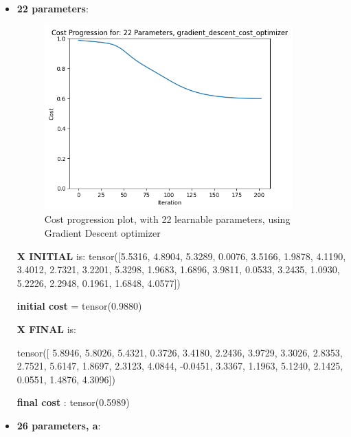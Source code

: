 \documentclass[inscr,ack,preface]{diphdthesis}
\begin{document}
\begin{itemize}
    \item \textbf{22 parameters}:

\begin{figure}[ht]
\begin{center}
    \includegraphics[width=0.9\textwidth]{22.png}
    \caption{Cost progression plot, with 22 learnable parameters, using Gradient Descent optimizer} 
    \label{fig:enter-label}
    \end{center}
\end{figure}

\textbf{X INITIAL} is:
 tensor([5.5316, 4.8904, 5.3289, 0.0076, 3.5166, 1.9878, 4.1190, 3.4012, 2.7321,
        3.2201, 5.3298, 1.9683, 1.6896, 3.9811, 0.0533, 3.2435, 1.0930, 5.2226,
        2.2948, 0.1961, 1.6848, 4.0577])
        
\textbf{initial cost} = tensor(0.9880)

\textbf{X FINAL} is:

 tensor([ 5.8946,  5.8026,  5.4321,  0.3726,  3.4180,  2.2436,  3.9729,  3.3026,
         2.8353,  2.7521,  5.6147,  1.8697,  2.3123,  4.0844, -0.0451,  3.3367,
         1.1963,  5.1240,  2.1425,  0.0551,  1.4876,  4.3096])

\textbf{final cost} : tensor(0.5989)

\item \textbf{26 parameters, a}:


\end{itemize}
\end{document}
